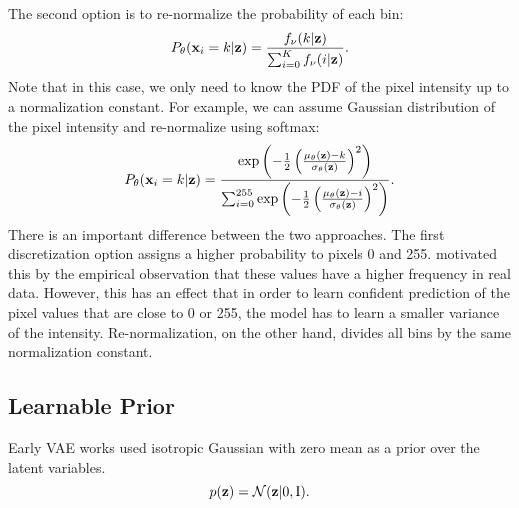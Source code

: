 The second option is to re-normalize the probability of each bin:
\begin{equation}\label{eq:intro_softmax_discr}
\begin{aligned}
    P_{\theta}(\rvx_i = k|\rvz) = \frac{f_{\nu}(k|\rvz)}{\sum_{i=0}^K f_{\nu}(i|\rvz)}.
\end{aligned}
\end{equation}
Note that in this case, we only need to know the PDF of the pixel intensity up to a normalization constant. For example, we can assume Gaussian distribution of the pixel intensity and re-normalize using softmax:
\begin{equation}
\begin{aligned}
    P_{\theta}({\mathbf{x}}_i = k|{\mathbf{z}}) = \frac{\exp\left(-\frac12 \left(\frac{\mu_{\theta}({\mathbf{z}}) - k}{\sigma_{\theta}({\mathbf{z}})}\right)^2\right)}{\sum_{i=0}^{255} \exp\left(-\frac12 \left(\frac{\mu_{\theta}({\mathbf{z}}) - i}{\sigma_{\theta}({\mathbf{z}})}\right)^2\right)}.
\end{aligned}
\end{equation}
There is an important difference between the two approaches. The first discretization option assigns a higher probability to pixels 0 and 255. \citet{salimans2016improved} motivated this by the empirical observation that these values have a higher frequency in real data. However, this has an effect that in order to learn confident prediction of the pixel values that are close to 0 or 255, the model has to learn a smaller variance of the intensity. Re-normalization, on the other hand, divides all bins by the same normalization constant.







\subsection{Learnable Prior}
Early VAE works used isotropic Gaussian with zero mean as a prior over the latent variables.
\begin{equation}
    p({\mathbf{z}}) = \mathcal{N}({\mathbf{z}} | 0, \text{I}).
\end{equation}

